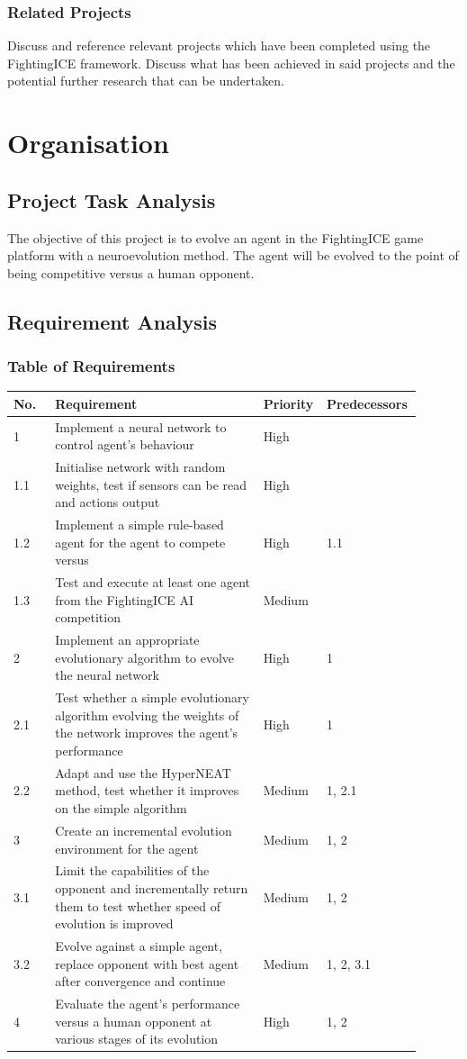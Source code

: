 \documentclass[11pt,a4paper]{article}
\begin{document}
\subsubsection{Related Projects}
Discuss and reference relevant projects which have been completed using the FightingICE framework. Discuss what has been achieved in said projects and the potential further research that can be undertaken.

\newpage
\section{Organisation}
\subsection{Project Task Analysis}
The objective of this project is to evolve an agent in the FightingICE game platform with a neuroevolution method. The agent will be evolved to the point of being competitive versus a human opponent. 
\newpage
\subsection{Requirement Analysis}
\subsubsection{Table of Requirements}
\begin{tabular}{|p{0.1\linewidth}|p{0.5\linewidth}|p{0.1\linewidth}|p{0.2\linewidth}|}
\hline
No. & Requirement & Priority & Predecessors\\ \hline
1 & Implement a neural network to control agent's behaviour & High &\\ \hline
1.1 & Initialise network with random weights, test if sensors can be read and actions output & High &\\ \hline
1.2 & Implement a simple rule-based agent for the agent to compete versus & High & 1.1\\ \hline
1.3 & Test and execute at least one agent from the FightingICE AI competition & Medium &\\ \hline
2 & Implement an appropriate evolutionary algorithm to evolve the neural network & High & 1\\ \hline
2.1 & Test whether a simple evolutionary algorithm evolving the weights of the network improves the agent's performance & High & 1\\ \hline
2.2 & Adapt and use the HyperNEAT method, test whether it improves on the simple algorithm & Medium & 1, 2.1\\ \hline
3 & Create an incremental evolution environment for the agent & Medium & 1, 2\\ \hline
3.1 & Limit the capabilities of the opponent and incrementally return them to test whether speed of evolution is improved & Medium & 1, 2\\ \hline
3.2 & Evolve against a simple agent, replace opponent with best agent after convergence and continue & Medium & 1, 2, 3.1\\ \hline 
4 & Evaluate the agent's performance versus a human opponent at various stages of its evolution & High & 1, 2\\ \hline
\end{tabular}
\newpage
\end{document}

